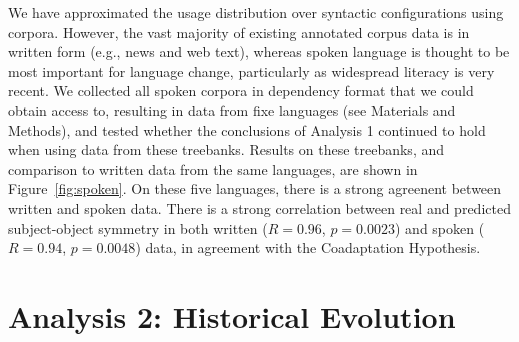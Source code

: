 \documentclass[11pt,a4paper]{article}
\newcommand\mhahn[1]{{\color{red}(#1)}}
\begin{document}
We have approximated the usage distribution over syntactic configurations using corpora.
However, the vast majority of existing annotated corpus data is in written form (e.g., news and web text), whereas spoken language is thought to be most important for language change, particularly as widespread literacy is very recent.
We collected all spoken corpora in dependency format that we could obtain access to, resulting in data from fixe languages (see Materials and Methods), and tested whether the conclusions of Analysis 1 continued to hold when using data from these treebanks.
Results on these treebanks, and comparison to written data from the same languages, are shown in Figure~\ref{fig:spoken}.
On these five languages, there is a strong agreenent between written and spoken data.
There is a strong correlation between real and predicted subject-object symmetry in both written ($R=0.96$, $p=0.0023$) and spoken ($R=0.94$, $p=0.0048$) data, in agreement with the Coadaptation Hypothesis.



\section{Analysis 2: Historical Evolution}




\end{document}

